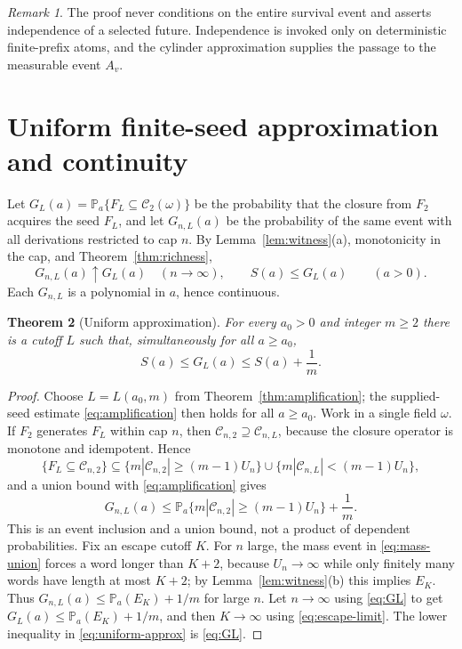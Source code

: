 \documentclass[11pt,reqno]{amsart}
\theoremstyle{plain}
\newtheorem{theorem}{Theorem}[section]
\theoremstyle{definition}
\theoremstyle{remark}
\newtheorem{remark}[theorem]{Remark}
\numberwithin{equation}{section}
\newcommand{\Prob}{\mathbb{P}}
\newcommand{\cC}{\mathcal{C}}
\begin{document}
\begin{remark}
The proof never conditions on the entire survival event and asserts independence of a selected future. Independence is invoked only on deterministic finite-prefix atoms, and the cylinder approximation supplies the passage to the measurable event $A_v$.
\end{remark}

\section{Uniform finite-seed approximation and continuity}\label{sec:continuity}

Let $G_L(a)=\Prob_a\{F_L\subseteq\cC_2(\omega)\}$ be the probability that the closure from $F_2$ acquires the seed $F_L$, and let $G_{n,L}(a)$ be the probability of the same event with all derivations restricted to cap $n$. By Lemma~\ref{lem:witness}(a), monotonicity in the cap, and Theorem~\ref{thm:richness},
\begin{equation}\label{eq:GL}
G_{n,L}(a)\uparrow G_L(a)\quad(n\to\infty),\qquad S(a)\le G_L(a)\qquad(a>0).
\end{equation}
Each $G_{n,L}$ is a polynomial in $a$, hence continuous.

\begin{theorem}[Uniform approximation]\label{thm:uniform-approx}
For every $a_0>0$ and integer $m\ge2$ there is a cutoff $L$ such that, simultaneously for all $a\ge a_0$,
\begin{equation}\label{eq:uniform-approx}
S(a)\le G_L(a)\le S(a)+\frac1m.
\end{equation}
\end{theorem}

\begin{proof}
Choose $L=L(a_0,m)$ from Theorem~\ref{thm:amplification}; the supplied-seed estimate \eqref{eq:amplification} then holds for all $a\ge a_0$. Work in a single field $\omega$. If $F_2$ generates $F_L$ within cap $n$, then $\cC_{n,2}\supseteq\cC_{n,L}$, because the closure operator is monotone and idempotent. Hence
\[
\{F_L\subseteq\cC_{n,2}\}\subseteq\{m|\cC_{n,2}|\ge(m-1)U_n\}\cup\{m|\cC_{n,L}|<(m-1)U_n\},
\]
and a union bound with \eqref{eq:amplification} gives
\begin{equation}\label{eq:mass-union}
G_{n,L}(a)\le\Prob_a\{m|\cC_{n,2}|\ge(m-1)U_n\}+\frac1m .
\end{equation}
This is an event inclusion and a union bound, not a product of dependent probabilities. Fix an escape cutoff $K$. For $n$ large, the mass event in \eqref{eq:mass-union} forces a word longer than $K+2$, because $U_n\to\infty$ while only finitely many words have length at most $K+2$; by Lemma~\ref{lem:witness}(b) this implies $E_K$. Thus $G_{n,L}(a)\le\Prob_a(E_K)+1/m$ for large $n$. Let $n\to\infty$ using \eqref{eq:GL} to get $G_L(a)\le\Prob_a(E_K)+1/m$, and then $K\to\infty$ using \eqref{eq:escape-limit}. The lower inequality in \eqref{eq:uniform-approx} is \eqref{eq:GL}.
\end{proof}
\end{document}
